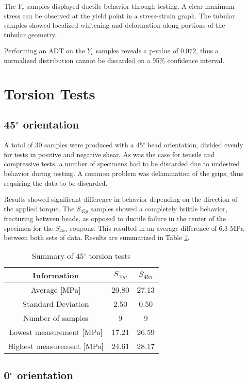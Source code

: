 \documentclass[main.tex]{subfiles}
\begin{document}
The $Y_c$ samples displayed ductile behavior through testing. A clear maximum stress can be observed at the yield point in a stress-strain graph. The tubular samples showed localized whitening and deformation along portions of the tubular geometry.

Performing an ADT on the $Y_c$ samples reveals a p-value of 0.072, thus a normalized distribution cannot be discarded on a 95\% confidence interval. 

\section{Torsion Tests} \label{sec:torsr}
\subsection{45$^\circ$ orientation} \label{ssec:45r}
A total of 30 samples were produced with a 45$^\circ$ bead orientation, divided evenly for tests in positive and negative shear. As was the case for tensile and compressive tests, a number of specimens had to be discarded due to undesired behavior during testing. A common problem was delamination of the grips, thus requiring the data to be discarded. 

Results showed significant difference in behavior depending on the direction of the applied torque. The $S_{45p}$ samples showed a completely brittle behavior, fracturing between beads, as opposed to ductile failure in the center of the specimen for the $S_{45n}$ coupons. This resulted in an average difference of 6.3 MPa between both sets of data. Results are summarized in Table \ref{tab:tors45r}.

\begin{table} [h]
	\centering
	\caption{Summary of 45$^\circ$ torsion tests}
\begin{tabular}{ c| c c } 
	\toprule
	\textbf{Information} & $S_{45p}$ & $S_{45n}$\\
	\midrule
	Average [MPa] & 20.80 & 27.13\\
	Standard Deviation & 2.50 & 0.50\\
	Number of samples & 9 & 9\\
	Lowest measurement [MPa] &17.21  & 26.59\\
	Highest measurement [MPa] &24.61 & 28.17\\
	\bottomrule
\end{tabular}
\label{tab:tors45r}
\end{table}
  
\subsection{0$^\circ$ orientation} \label{ssec:0r}
\end{document}
